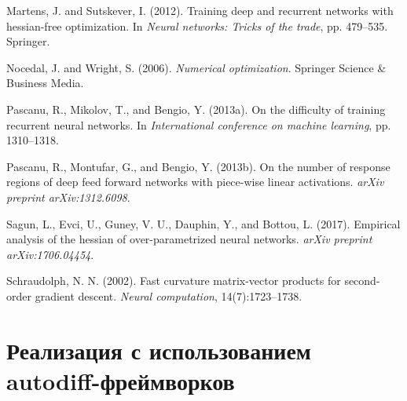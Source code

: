 \documentclass[11pt]{article}
\begin{document}
\begin{thebibliography}{10}
  Martens, J. and Sutskever, I. (2012).
  \newblock Training deep and recurrent networks with hessian-free optimization.
  \newblock In \textit{Neural networks: Tricks of the trade}, pp. 479--535. Springer.

  Nocedal, J. and Wright, S. (2006).
  \newblock \textit{Numerical optimization}.
  \newblock Springer Science \& Business Media.

  Pascanu, R., Mikolov, T., and Bengio, Y. (2013a).
  \newblock On the difficulty of training recurrent neural networks.
  \newblock In \textit{International conference on machine learning}, pp. 1310--1318.

  Pascanu, R., Montufar, G., and Bengio, Y. (2013b).
  \newblock On the number of response regions of deep feed forward networks with piece-wise linear activations.
  \newblock \textit{arXiv preprint arXiv:1312.6098}.

  Sagun, L., Evci, U., Guney, V. U., Dauphin, Y., and Bottou, L. (2017).
  \newblock Empirical analysis of the hessian of over-parametrized neural networks.
  \newblock \textit{arXiv preprint arXiv:1706.04454}.

  Schraudolph, N. N. (2002).
  \newblock Fast curvature matrix-vector products for second-order gradient descent.
  \newblock \textit{Neural computation}, 14(7):1723--1738.
\end{thebibliography}

\newpage
\appendix
\section{Реализация с использованием autodiff-фреймворков}
\end{document}
